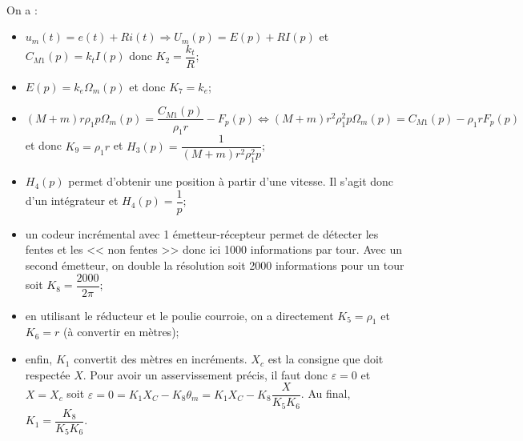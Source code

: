 \ifprof
\begin{corrige}~\\
On a :
\begin{itemize}
\item $ u_m(t)=e(t)+Ri(t) \Rightarrow  U_m(p)=E(p)+RI(p) $ et $C_{M1}(p)=k_t I(p)$ donc $K_2 = \dfrac{k_t}{R}$;
\item $E(p)=k_e\Omega_m(p)$ et donc $K_7 = k_e$;
\item $\left(M+m\right)r\rho_1 p\Omega_m(p)=\dfrac{C_{M1}(p)}{\rho_1 r}-F_p(p) \Leftrightarrow\left(M+m\right)r^2\rho_1^2 p\Omega_m(p)=C_{M1}(p)-\rho_1 rF_p(p) $ et donc $K_9 = \rho_1 r$ et $H_3(p)=\dfrac{1}{\left(M+m\right)r^2\rho_1^2 p}$;
\item  $H_4(p)$ permet d'obtenir une position à partir d'une vitesse. Il s'agit donc d'un intégrateur et $H_4(p)=\dfrac{1}{p}$; 
\item un codeur incrémental avec 1 émetteur-récepteur permet de détecter les fentes et les << non fentes >> donc ici 1000 informations par tour. Avec un second émetteur, on double la résolution soit 2000 informations pour un tour soit $K_8  = \dfrac{2000}{2\pi}$;
\item en utilisant le réducteur et le poulie courroie, on a directement $K_5=\rho_1$ et $K_6=r$ (à convertir en mètres);
\item enfin, $K_1$ convertit des mètres en incréments. $X_c$ est la consigne que doit respectée $X$. Pour avoir un asservissement précis, il faut donc $\varepsilon = 0$ et $X=X_c$ soit $\varepsilon = 0 = K_1 X_C - K_8 \theta_m = K_1 X_C - K_8 \dfrac{X}{K_5 K_6}$. Au final, $K_1 =\dfrac{K_8}{K_5 K_6}$.
\end{itemize}
\end{corrige}
\else
\fi

